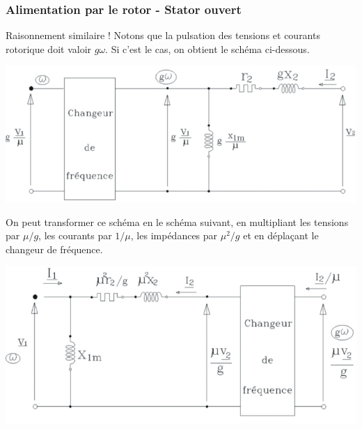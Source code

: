		\subsubsection{Alimentation par le rotor - Stator ouvert}
		Raisonnement similaire ! Notons que la pulsation des tensions et courants rotorique 
		doit valoir $g\omega$. Si c'est le cas, on obtient le schéma ci-dessous.
		\begin{center}
		\vspace{-3mm}
		\includegraphics[scale=0.45]{ch5/image23.png}
		\end{center}
		\newpage
		On peut transformer ce schéma en le schéma suivant, en multipliant les tensions par 
		$\mu/g$, les courants par $1/\mu$, les impédances par $\mu^2/g$ et en déplaçant le 
		changeur de fréquence.
		\begin{center}
		\includegraphics[scale=0.5]{ch5/image24.png}
		\end{center}


